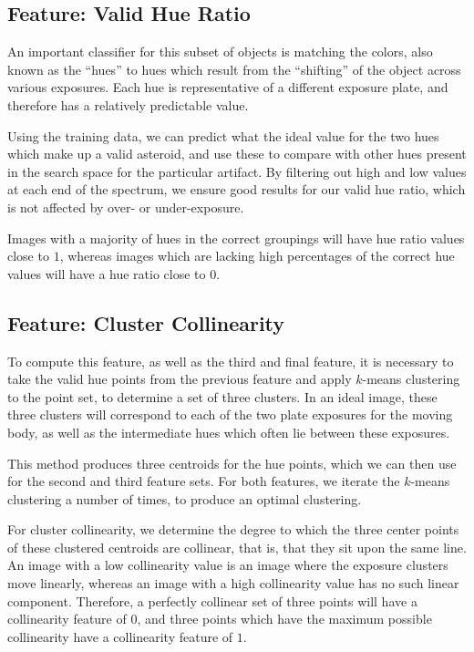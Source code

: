 \documentclass[conference]{IEEEtran}
\begin{document}
\subsection{Feature: Valid Hue Ratio}
An important classifier for this subset of objects is matching the colors, also
known as the ``hues'' to hues which result from the ``shifting'' of the object
across various exposures. Each hue is representative of a different exposure
plate, and therefore has a relatively predictable value. 

Using the training data, we can predict what the ideal value for the two hues
which make up a valid asteroid, and use these to compare with other hues present
in the search space for the particular artifact. By filtering out high and low
values at each end of the spectrum, we ensure good results for our valid hue
ratio, which is not affected by over- or under-exposure.

Images with a majority of hues in the correct groupings will have hue ratio
values close to $1$, whereas images which are lacking high percentages of the
correct hue values will have a hue ratio close to $0$.

\subsection{Feature: Cluster Collinearity}
To compute this feature, as well as the third and final feature, it is necessary
to take the valid hue points from the previous feature and apply $k$-means
clustering to the point set, to determine a set of three clusters. In an ideal
image, these three clusters will correspond to each of the two plate exposures
for the moving body, as well as the intermediate hues which often lie between
these exposures.

This method produces three centroids for the hue points, which we can then use
for the second and third feature sets. For both features, we iterate the
$k$-means clustering a number of times, to produce an optimal clustering.

For cluster collinearity, we determine the degree to which the three center
points of these clustered centroids are collinear, that is, that they sit upon
the same line. An image with a low collinearity value is an image where the
exposure clusters move linearly, whereas an image with a high collinearity value
has no such linear component. Therefore, a perfectly collinear set of three
points will have a collinearity feature of $0$, and three points which have the
maximum possible collinearity have a collinearity feature of $1$.
\end{document}
